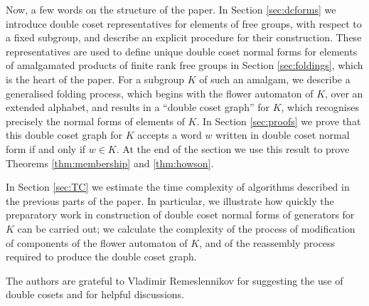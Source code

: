\documentclass[a4paper,12pt]{article}
\numberwithin{equation}{section}
\numberwithin{figure}{section}
\begin{document}
Now, a few words on the structure of the paper. In Section
\ref{sec:dcforms} we introduce double coset representatives for
elements of free groups, with respect to a fixed subgroup,
and
  describe an explicit procedure
 for their construction.
These representatives are used to define unique double coset normal forms
for elements of
amalgamated products of finite rank free groups in Section  \ref{sec:foldings}, which
 is the heart of the paper. For a subgroup $K$ of such an amalgam, we
describe a generalised folding process, which begins with the flower automaton
of $K$, over an extended alphabet, and results in
a ``double coset graph'' for $K$, which  recognises
precisely the  normal forms of elements of $K$. 
In Section \ref{sec:proofs} we prove that this double coset graph for 
$K$ accepts a word $w$ written in double coset normal form if and only
if $w\in K$. At the end of the section we use this result to prove
Theorems \ref{thm:membership} and \ref{thm:howson}.

In Section \ref{sec:TC} we estimate the time complexity of
algorithms described in the previous parts of the paper. In
particular, we illustrate how quickly the  preparatory
work in construction of  double coset normal forms of generators
for $K$  can be carried out; we calculate  the complexity of the process of
modification of
components of the flower automaton of $K$, and of the reassembly process required to
produce the double coset graph.

The authors are grateful to Vladimir Remeslennikov for suggesting the use of double
cosets and
for helpful
discussions. 
\end{document}
